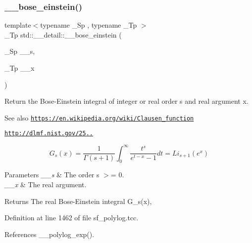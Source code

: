\subsubsection{\texorpdfstring{\+\_\+\+\_\+bose\+\_\+einstein()}{\_\_bose\_einstein()}}
{\footnotesize\ttfamily template$<$typename \+\_\+\+Sp , typename \+\_\+\+Tp $>$ \\
\+\_\+\+Tp std\+::\+\_\+\+\_\+detail\+::\+\_\+\+\_\+bose\+\_\+einstein (\begin{DoxyParamCaption}\item[{\+\_\+\+Sp}]{\+\_\+\+\_\+s,  }\item[{\+\_\+\+Tp}]{\+\_\+\+\_\+x }\end{DoxyParamCaption})}

Return the Bose-\/\+Einstein integral of integer or real order s and real argument x. \begin{DoxySeeAlso}{See also}
\href{https://en.wikipedia.org/wiki/Clausen_function}{\tt https\+://en.\+wikipedia.\+org/wiki/\+Clausen\+\_\+function} 

\href{http://dlmf.nist.gov/25.12.16}{\tt http\+://dlmf.\+nist.\+gov/25..}
\end{DoxySeeAlso}
\[ G_s(x) = \frac{1}{\Gamma(s+1)}\int_0^\infty \frac{t^s}{e^{t-x} - 1}dt = Li_{s+1}(e^x) \]


\begin{DoxyParams}{Parameters}
{\em \+\_\+\+\_\+s} & The order s $>$= 0. \\
\hline
{\em \+\_\+\+\_\+x} & The real argument. \\
\hline
\end{DoxyParams}
\begin{DoxyReturn}{Returns}
The real Bose-\/\+Einstein integral G\+\_\+s(x), 
\end{DoxyReturn}


Definition at line 1462 of file sf\+\_\+polylog.\+tcc.



References \+\_\+\+\_\+polylog\+\_\+exp().

\mbox{\label{namespacestd_1_1____detail_a3a893b4c60f3245af5db4ca792c4b2cf}} 
